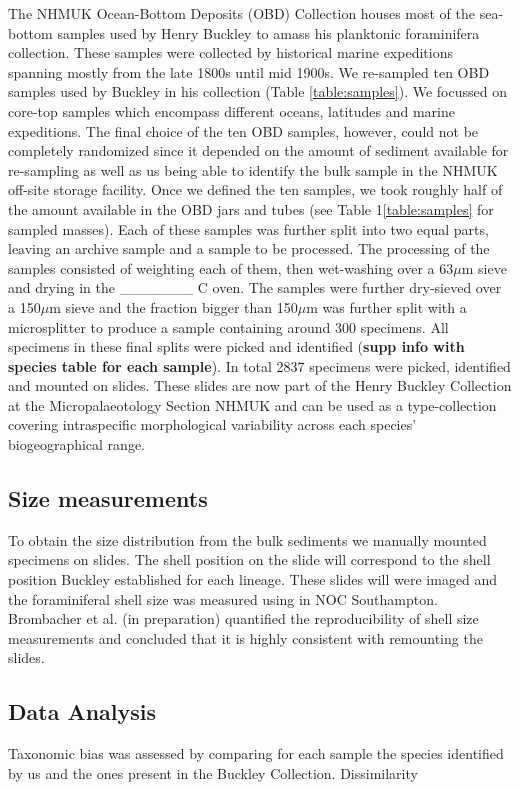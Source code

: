 \documentclass[a4paper]{article}
\begin{document}
The NHMUK Ocean-Bottom Deposits (OBD) Collection houses most of the sea-bottom samples used by Henry Buckley to amass his planktonic foraminifera collection. These samples were collected by historical marine expeditions spanning mostly from the late 1800s until mid 1900s. 
We re-sampled ten OBD samples used by Buckley in his collection (Table \ref{table:samples}). We focussed on core-top samples which encompass different oceans, latitudes and marine expeditions. The final choice of the ten OBD samples, however, could not be completely randomized since it depended on the amount of sediment available for re-sampling as well as us being able to identify the bulk sample in the NHMUK off-site storage facility.
Once we defined the ten samples, we took roughly half of the amount available in the OBD jars and tubes (see Table 1\ref{table:samples} for sampled masses). Each of these samples was further split into two equal parts, leaving an archive sample and a sample to be processed. The processing of the samples consisted of weighting each of them, then wet-washing over a 63$\mu$m sieve and drying in the _______ C oven. The samples were further dry-sieved over a 150$\mu$m sieve and the fraction bigger than 150$\mu$m was further split with a microsplitter to produce a sample containing around 300 specimens. All specimens in these final splits were picked and identified (\textbf{supp info with species table for each sample}). In total 2837 specimens were picked, identified and mounted on slides. These slides are now part of the Henry Buckley Collection at the Micropalaeotology Section NHMUK and can be used as a type-collection covering intraspecific morphological variability across each species' biogeographical range. 

	

	\subsection{Size measurements}
	
To obtain the size distribution from the bulk sediments we manually mounted specimens on slides. The shell position on the slide will correspond to the shell position Buckley established for each lineage. These slides will were imaged and the foraminiferal shell size was measured using in NOC Southampton. Brombacher et al. (in preparation) quantified the reproducibility of shell size measurements and concluded that it is highly consistent with remounting the slides.


	\subsection{Data Analysis}
Taxonomic bias was assessed by comparing for each sample the species identified by us and the ones present in the Buckley Collection. Dissimilarity 
	
\end{document}
